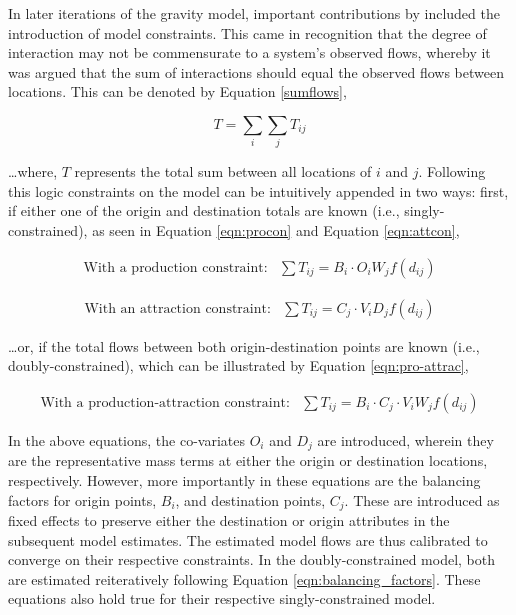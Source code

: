 In later iterations of the gravity model, important contributions by \cite{wilson1971family} included the introduction of model constraints. This came in recognition that the degree of interaction may not be commensurate to a system's observed flows, whereby it was argued that the sum of interactions should equal the observed flows between locations. This can be denoted by Equation \ref{sumflows}, 

\begin{equation}
\label{sumflows}
    T = \sum_{i}\sum_{j}T_{ij}
\end{equation}

\ldots where, $T$ represents the total sum between all locations of ${i}$ and ${j}$. Following this logic constraints on the model can be intuitively appended in two ways: first, if either one of the origin and destination totals are known (i.e., singly-constrained), as seen in Equation \ref{eqn:procon} and Equation \ref{eqn:attcon}, 

\begin{equation}
\begin{matrix}
\text{With a production constraint:} & \sum T_{ij} = B_{i} \cdot O_{i} W_{j} f(d_{ij})
\end{matrix}
\label{eqn:procon}    
\end{equation}

\begin{equation}
\begin{matrix}
\text{With an attraction constraint:} & \sum T_{ij} = C_{j} \cdot V_{i} D_{j} f(d_{ij})
\label{eqn:attcon}    
\end{matrix}
\end{equation}

\ldots or, if the total flows between both origin-destination points are known (i.e., doubly-constrained), which can be illustrated by Equation \ref{eqn:pro-attrac},

\begin{equation}
\begin{matrix}
\text{With a production-attraction constraint:} & \sum T_{ij} = B_{i} \cdot C_{j} \cdot V_{i} W_{j} f(d_{ij})
\end{matrix}
    \label{eqn:pro-attrac}
\end{equation}

In the above equations, the co-variates $O_i$ and $D_j$ are introduced, wherein they are the representative mass terms at either the origin or destination locations, respectively. However, more importantly in these equations are the balancing factors for origin points, $B_{i}$, and destination points, $C_{j}$. These are introduced as fixed effects to preserve either the destination or origin attributes in the subsequent model estimates.  The estimated model flows are thus calibrated to converge on their respective constraints. In the doubly-constrained model, both are estimated reiteratively following Equation \ref{eqn:balancing_factors}. These equations also hold true for their respective singly-constrained model.

